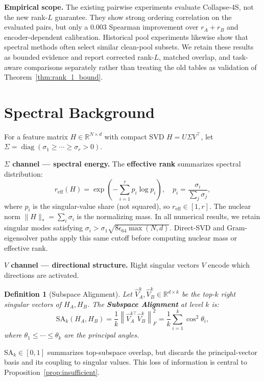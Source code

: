 \documentclass{article}
\newcommand{\reff}{\ensuremath{r_{\mathrm{eff}}}\xspace}
\newcommand{\SAk}{\ensuremath{\mathrm{SA}_k}\xspace}
\newcommand{\R}{\ensuremath{\mathbb{R}}}
\newcommand{\norm}[1]{\ensuremath{\left\lVert#1\right\rVert}}
\newtheorem{definition}{Definition}
\begin{document}
\textbf{Empirical scope.}
The existing pairwise experiments evaluate Collapse-4S, not the new
rank-$L$ guarantee.  They show strong ordering correlation on the evaluated
pairs, but only a $0.003$ Spearman improvement over $r_A{+}r_B$ and
encoder-dependent calibration.  Historical pool experiments likewise show
that spectral methods often select similar clean-pool subsets.  We retain
these results as bounded evidence and report corrected rank-$L$, matched
overlap, and task-aware comparisons separately rather than treating the old
tables as validation of Theorem~\ref{thm:rank_l_bound}.

\section{Spectral Background}
\label{sec:background}

For a feature matrix $H\in\R^{N\times d}$ with compact SVD
$H=U\Sigma V^\top$, let
$\Sigma=\operatorname{diag}(\sigma_1\geq\cdots\geq\sigma_r>0)$.

\textbf{$\Sigma$ channel --- spectral energy.}
The \textbf{effective rank} summarizes spectral distribution:
\begin{equation}
  \reff(H) = \exp\!\left(-\sum_{i=1}^r p_i \log p_i\right),
  \quad p_i = \frac{\sigma_i}{\sum_j \sigma_j},
  \label{eq:reff}
\end{equation}
where $p_i$ is the singular-value share (not squared), so $r_{\mathrm{eff}}\in[1,r]$.
The nuclear norm $\|H\|_*=\sum_i\sigma_i$ is the normalizing mass.
In all numerical results, we retain singular modes satisfying
$\sigma_i>\sigma_1\sqrt{8\epsilon_{64}\max(N,d)}$.
Direct-SVD and Gram-eigensolver paths apply this same cutoff before
computing nuclear mass or effective rank.

\textbf{$V$ channel --- directional structure.}
Right singular vectors $V$ encode which directions are activated.
\begin{definition}[Subspace Alignment]
\label{def:sa}
Let $\hat{V}_A^k,\hat{V}_B^k\in\R^{d\times k}$ be the top-$k$ right singular
vectors of $H_A,H_B$.
The \textbf{Subspace Alignment} at level $k$ is:
\begin{equation}
  \SAk(H_A,H_B) = \frac{1}{k}\norm{\hat{V}_A^{k\top}\hat{V}_B^k}_F^2
  = \frac{1}{k}\sum_{i=1}^k\cos^2\theta_i,
  \label{eq:sak}
\end{equation}
where $\theta_1\leq\cdots\leq\theta_k$ are the principal angles.
\end{definition}
$\SAk\in[0,1]$ summarizes top-subspace overlap, but discards the
principal-vector basis and its coupling to singular values.  This loss of
information is central to Proposition~\ref{prop:insufficient}.
\end{document}
